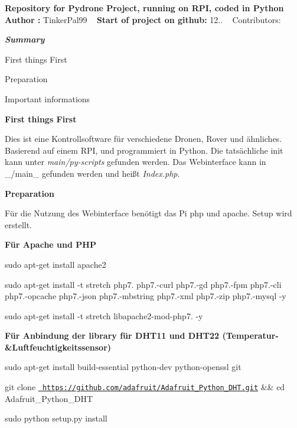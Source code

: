 {\bfseries{Repository for Pydrone Project, running on R\+PI, coded in Python}} ~\newline
 {\bfseries{Author \+:}} Tinker\+Pal99 ~\newline
 {\bfseries{Start of project on github\+:}} 12.. ~\newline
 Contributors\+:

{\bfseries{{\itshape Summary}}}
\begin{DoxyEnumerate}
\item First things First
\item Preparation
\item Important informations
\end{DoxyEnumerate}

{\bfseries{First things First}}

Dies ist eine Kontrollsoftware für verschiedene Dronen, Rover und ähnliches. Basierend auf einem R\+PI, und programmiert in Python. Die tatsächliche init kann unter {\itshape main/py-\/scripts} gefunden werden. Das Webinterface kann in \+\_\+/main\+\_\+ gefunden werden und heißt {\itshape Index.\+php}.

{\bfseries{Preparation}}

Für die Nutzung des Webinterface benötigt das Pi php und apache. Setup wird erstellt.

{\bfseries{Für Apache und P\+HP}}


\begin{DoxyEnumerate}
\item sudo apt-\/get install apache2
\item sudo apt-\/get install -\/t stretch php7. php7.-\/curl php7.-\/gd php7.-\/fpm php7.-\/cli php7.-\/opcache php7.-\/json php7.-\/mbstring php7.-\/xml php7.-\/zip php7.-\/mysql -\/y
\item sudo apt-\/get install -\/t stretch libapache2-\/mod-\/php7. -\/y
\end{DoxyEnumerate}

{\bfseries{Für Anbindung der library für D\+H\+T11 und D\+H\+T22 (Temperatur-\/\&Luftfeuchtigkeitssensor)}}


\begin{DoxyEnumerate}
\item sudo apt-\/get install build-\/essential python-\/dev python-\/openssl git
\item git clone \href{https://github.com/adafruit/Adafruit_Python_DHT.git}{\texttt{ https\+://github.\+com/adafruit/\+Adafruit\+\_\+\+Python\+\_\+\+D\+H\+T.\+git}} \&\& cd Adafruit\+\_\+\+Python\+\_\+\+D\+HT
\item sudo python setup.\+py install
\end{DoxyEnumerate}

